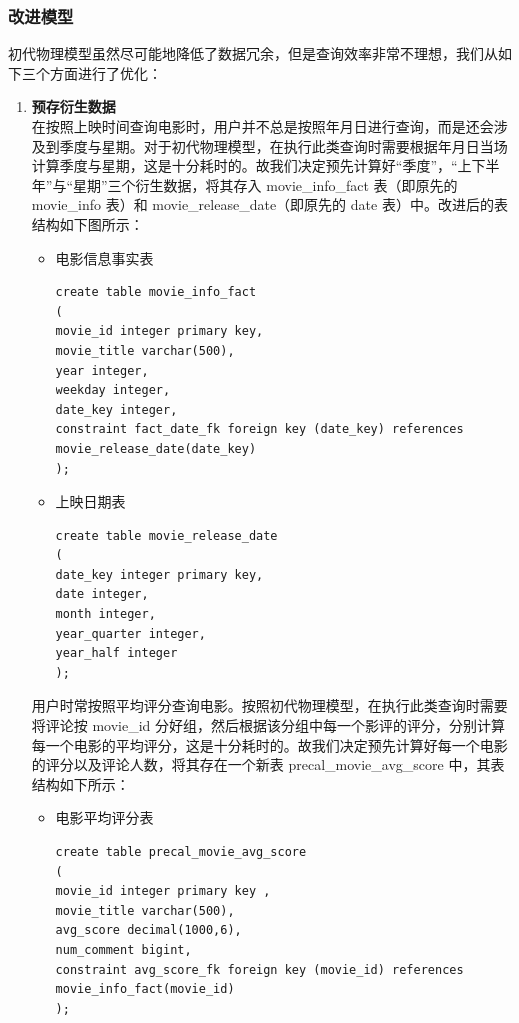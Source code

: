 \documentclass{ctexrep}
\begin{document}
	\subsubsection{改进模型} \label{mysql:2}
    初代物理模型虽然尽可能地降低了数据冗余，但是查询效率非常不理想，我们从如下三个方面进行了优化：
    \begin{enumerate}
        \item \textbf{预存衍生数据}\\
        在按照上映时间查询电影时，用户并不总是按照年月日进行查询，而是还会涉及到季度与星期。对于初代物理模型，在执行此类查询时需要根据年月日当场计算季度与星期，这是十分耗时的。故我们决定预先计算好“季度”，“上下半年”与“星期”三个衍生数据，将其存入 movie\_info\_fact 表（即原先的 movie\_info 表）和 movie\_release\_date（即原先的 date 表）中。改进后的表结构如下图所示：
        \begin{itemize}
            \item 电影信息事实表
                \begin{lstlisting}
create table movie_info_fact
(
movie_id integer primary key,
movie_title varchar(500),
year integer,
weekday integer,
date_key integer,
constraint fact_date_fk foreign key (date_key) references movie_release_date(date_key)
);
                \end{lstlisting}
            \item 上映日期表
                \begin{lstlisting}
create table movie_release_date
(
date_key integer primary key,
date integer,
month integer,
year_quarter integer,
year_half integer
);
                \end{lstlisting}
        \end{itemize}
        用户时常按照平均评分查询电影。按照初代物理模型，在执行此类查询时需要将评论按 movie\_id 分好组，然后根据该分组中每一个影评的评分，分别计算每一个电影的平均评分，这是十分耗时的。故我们决定预先计算好每一个电影的评分以及评论人数，将其存在一个新表 precal\_movie\_avg\_score 中，其表结构如下所示：
        \begin{itemize}
            \item 电影平均评分表
                \begin{lstlisting}
create table precal_movie_avg_score
(
movie_id integer primary key ,
movie_title varchar(500),
avg_score decimal(1000,6),
num_comment bigint,
constraint avg_score_fk foreign key (movie_id) references movie_info_fact(movie_id)
);
                \end{lstlisting}
        \end{itemize}

\end{enumerate}
\end{document}
